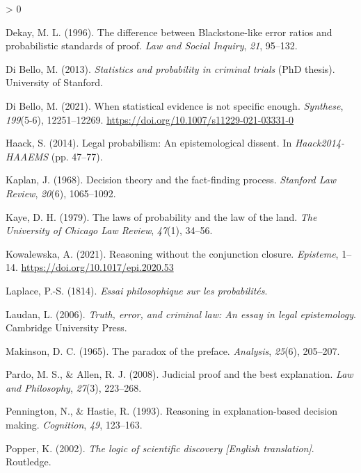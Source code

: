 \documentclass[
  10pt,
  dvipsnames,enabledeprecatedfontcommands]{scrartcl}
\newlength{\cslhangindent}
\newenvironment{CSLReferences}[2] %
 {%
  \setlength{\parindent}{0pt}
  \ifodd #1 \everypar{\setlength{\hangindent}{\cslhangindent}}\ignorespaces\fi
  \ifnum #2 > 0
  \setlength{\parskip}{#2\baselineskip}
  \fi
 }%
 {}
\begin{document}
\begin{CSLReferences}{1}{0}
\leavevmode\hypertarget{ref-Dekay1996}{}%
Dekay, M. L. (1996). The difference between {B}lackstone-like error
ratios and probabilistic standards of proof. \emph{Law and Social
Inquiry}, \emph{21}, 95--132.

\leavevmode\hypertarget{ref-di2013statistics}{}%
Di Bello, M. (2013). \emph{Statistics and probability in criminal
trials} (PhD thesis). University of Stanford.

\leavevmode\hypertarget{ref-DiBello2021Specific}{}%
Di Bello, M. (2021). When statistical evidence is not specific enough.
\emph{Synthese}, \emph{199}(5-6), 12251--12269.
\url{https://doi.org/10.1007/s11229-021-03331-0}

\leavevmode\hypertarget{ref-haack2011legal}{}%
Haack, S. (2014). Legal probabilism: An epistemological dissent. In
\emph{{Haack2014-HAAEMS}} (pp. 47--77).

\leavevmode\hypertarget{ref-Kaplan1968decision}{}%
Kaplan, J. (1968). Decision theory and the fact-finding process.
\emph{Stanford Law Review}, \emph{20}(6), 1065--1092.

\leavevmode\hypertarget{ref-kaye79}{}%
Kaye, D. H. (1979). The laws of probability and the law of the land.
\emph{The University of Chicago Law Review}, \emph{47}(1), 34--56.

\leavevmode\hypertarget{ref-Kowalewska2021conjunction}{}%
Kowalewska, A. (2021). Reasoning without the conjunction closure.
\emph{Episteme}, 1--14. \url{https://doi.org/10.1017/epi.2020.53}

\leavevmode\hypertarget{ref-Laplace1814}{}%
Laplace, P.-S. (1814). \emph{Essai philosophique sur les probabilités}.

\leavevmode\hypertarget{ref-laudan2006truth}{}%
Laudan, L. (2006). \emph{Truth, error, and criminal law: An essay in
legal epistemology}. Cambridge University Press.

\leavevmode\hypertarget{ref-Makinson1965-MAKTPO-2}{}%
Makinson, D. C. (1965). The paradox of the preface. \emph{Analysis},
\emph{25}(6), 205--207.

\leavevmode\hypertarget{ref-Pardo2008judicial}{}%
Pardo, M. S., \& Allen, R. J. (2008). Judicial proof and the best
explanation. \emph{Law and Philosophy}, \emph{27}(3), 223--268.

\leavevmode\hypertarget{ref-penn1993}{}%
Pennington, N., \& Hastie, R. (1993). Reasoning in explanation-based
decision making. \emph{Cognition}, \emph{49}, 123--163.

\leavevmode\hypertarget{ref-Popper2002}{}%
Popper, K. (2002). \emph{The logic of scientific discovery {[}{E}nglish
translation{]}}. Routledge.


\end{CSLReferences}
\end{document}
